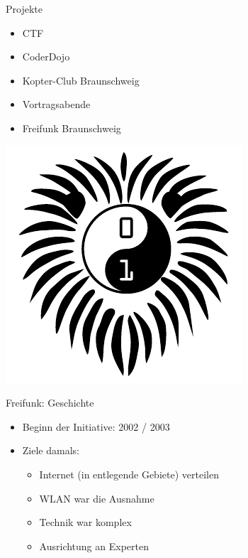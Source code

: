 \documentclass[fleqn,11pt,aspectratio=169]{beamer}
\begin{document}
\begin{frame}{Projekte}
	\begin{multicols*}{2}
	\begin{block}{}
  \begin{itemize}
		\item CTF
		\item CoderDojo
		\item Kopter-Club Braunschweig
		\item Vortragsabende
		\item Freifunk Braunschweig
	\end{itemize}
	\end{block}
	\centering
	\includegraphics[height=0.9\textheight]{coderdojo.pdf}
\end{multicols*}
\end{frame}

\begin{frame}{Freifunk: Geschichte}
	\begin{block}{}
  \begin{itemize}
		\item Beginn der Initiative: 2002 / 2003
		\item Ziele damals:
		\begin{itemize}
			\item Internet (in entlegende Gebiete) verteilen
			\item WLAN war die Ausnahme
			\item Technik war komplex
			\item Ausrichtung an Experten
		\end{itemize}
	\end{itemize}
	\end{block}
\end{frame}
\end{document}
